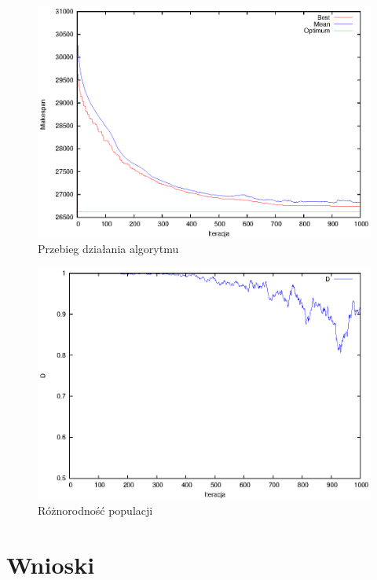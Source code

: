 \documentclass[11pt, a4wide]{article}
\begin{document}
\begin{figure}[H]
\caption{Przebieg działania algorytmu}
\label{progress}
\begin{center}
  \includegraphics{progres.eps}
\end{center}
\end{figure}

\begin{figure}[H]
\caption{Różnorodność populacji}
\label{diversity}
\begin{center}
  \includegraphics{diversity.eps}
\end{center}
\end{figure}





\section{Wnioski}  
\end{document}
